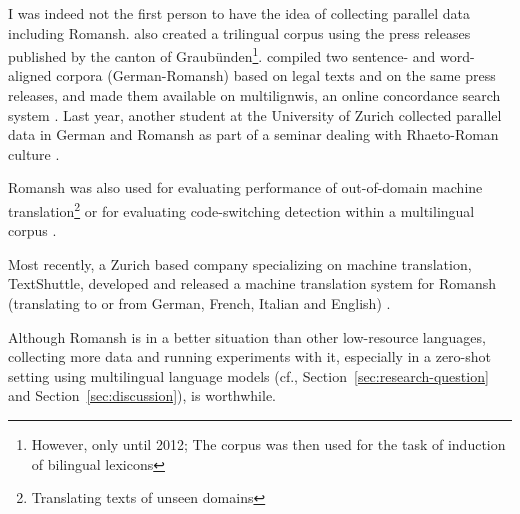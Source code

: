 I was indeed not the first person to have the idea of collecting parallel data including Romansh. 
\cite{scherrer-cartoni-2012-trilingual} also created a trilingual corpus using the press releases published by the canton of Graubünden\footnote{However, only until 2012; The corpus was then used for the task of induction of bilingual lexicons}. 
\cite{weibel-2014} compiled two sentence- and word-aligned corpora (German-Romansh) based on legal texts and on the same press releases, and made them available on multilignwis, an online concordance search system \autocite{multilingwis}. 
Last year, another student at the University of Zurich collected parallel data in German and Romansh as part of a seminar dealing with Rhaeto-Roman culture \autocite{gasner-2021}.

Romansh was also used for evaluating performance of out-of-domain machine translation\footnote{Translating texts of unseen domains} \autocite{muller-etal-2020-domain} or for evaluating code-switching detection within a multilingual corpus \autocite{volk-clematide-2014-detecting}.

Most recently, a Zurich based company specializing on machine translation, TextShuttle, developed and released a machine translation system for Romansh (translating to or from German, French, Italian and English) \autocite{textshuttle}.

Although Romansh is in a better situation than other low-resource languages, collecting more data and running experiments with it, especially in a zero-shot setting using multilingual language models (cf., Section~\ref{sec:research-question} and Section~\ref{sec:discussion}), is worthwhile.

